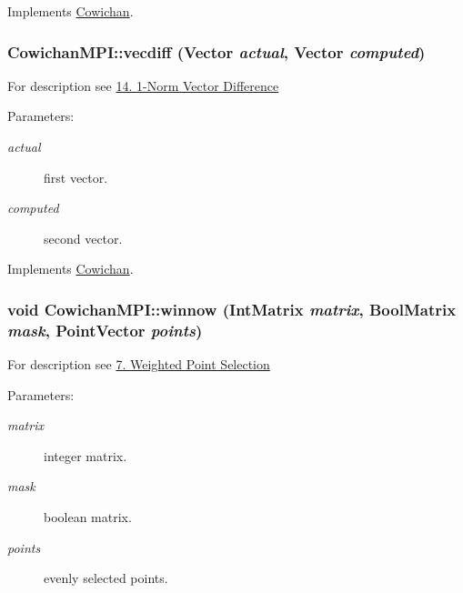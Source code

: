 Implements \hyperlink{class_cowichan_a0b633b8c1f21884e0998a9c7020c08c}{Cowichan}.\hypertarget{class_cowichan_m_p_i_c5470a2876efecf843b19c37c21ecf19}{
\subsubsection[{vecdiff}]{ CowichanMPI::vecdiff ({\bf Vector} {\em actual}, \/  {\bf Vector} {\em computed})}}
\label{class_cowichan_m_p_i_c5470a2876efecf843b19c37c21ecf19}


For description see \hyperlink{index_vecdiff_sec}{14. 1-Norm Vector Difference} \begin{Desc}
\item[Parameters:]
\begin{description}
\item[{\em actual}]first vector. \item[{\em computed}]second vector. \end{description}
\end{Desc}


Implements \hyperlink{class_cowichan_775d72b5e7d122f9f32555352278250e}{Cowichan}.\hypertarget{class_cowichan_m_p_i_9be48d86fc51ce13ef79d5fe2c8a16e0}{
\subsubsection[{winnow}]{\setlength{\rightskip}{0pt plus 5cm}void CowichanMPI::winnow ({\bf IntMatrix} {\em matrix}, \/  {\bf BoolMatrix} {\em mask}, \/  {\bf PointVector} {\em points})}}
\label{class_cowichan_m_p_i_9be48d86fc51ce13ef79d5fe2c8a16e0}


For description see \hyperlink{index_winnow_sec}{7. Weighted Point Selection} \begin{Desc}
\item[Parameters:]
\begin{description}
\item[{\em matrix}]integer matrix. \item[{\em mask}]boolean matrix. \item[{\em points}]evenly selected points. \end{description}
\end{Desc}



